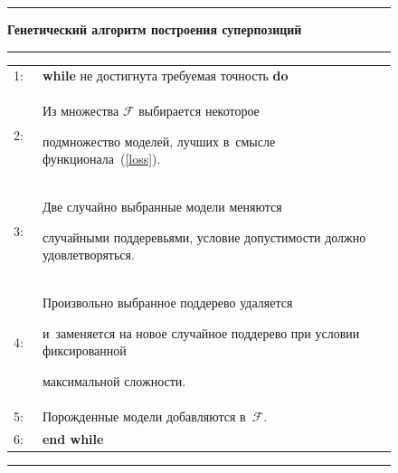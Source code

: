 \begin{figure}

{\small \hrule



\vspace*{3pt}



\textbf{Генетический алгоритм построения суперпозиций}



\vspace*{3pt}



\hrule



\vspace*{3pt}



\begin{tabular}{lp{120mm}}



{\scriptsize 1}:\ &\textbf{while} не достигнута требуемая точность \textbf{do}\\



{\scriptsize 2:}\ &\hspace*{2mm}Из множества $\mathcal{F}$ выбирается некоторое 

подмножество моделей, лучших в~смысле функционала~(\ref{loss}).\\

    

{\scriptsize 3:}\  &\hspace*{2mm}Две случайно выбранные модели меняются 

случайными поддеревьями, условие допустимости должно удовлетворяться.\\



{\scriptsize 4}:\ &\hspace*{2mm}Произвольно выбранное поддерево удаляется 

и~заменяется на  новое случайное поддерево при условии фиксированной 

максимальной сложности.\\



{\scriptsize 5}: &\hspace*{2mm}Порожденные модели добавляются в~$\mathcal{F}$.\\



{\scriptsize 6}:\ &\textbf{end while}

\end{tabular}



\vspace*{3pt}



\hrule

}





\end{figure}



